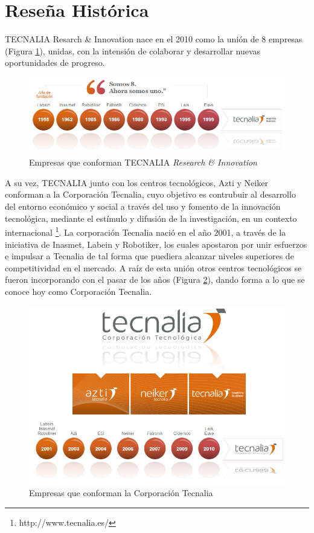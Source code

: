 \section{Reseña Histórica}
TECNALIA Resarch \& Innovation nace en el 2010 como la unión de 8 empresas (Figura \ref{fig:tecnaliah}), unidas, con la intensión de colaborar y desarrollar nuevas oportunidades de progreso.\\  
\begin{figure}[!h]
	\centering
		\includegraphics[scale=0.7]{Imagenes/tecnaliah}
		\caption[Empresas que conforman TECNALIA \textit{Research \& Innovation}, for L0F]{Empresas que conforman TECNALIA \textit{Research \& Innovation} \protect\footnotemark}
		\label{fig:tecnaliah}
	\end{figure}	  
\par A su vez, TECNALIA junto con los centros tecnológicos, Azti y Neiker conforman a la Corporación Tecnalia, cuyo objetivo es contrubuir al desarrollo del entorno económico y social a través del uso y fomento de la innovación tecnológica, mediante el estímulo y difusión de la investigación, en un contexto internacional \footnote{http://www.tecnalia.es/}. La corporación Tecnalia nació en el año 2001, a través de la iniciativa de Inasmet, Labein y Robotiker, los cuales apostaron por unir esfuerzos e impulsar a Tecnalia de tal forma que puediera alcanzar niveles superiores de competitividad en el mercado. A raíz de esta unión otros centros tecnológicos se fueron incorporando con el pasar de los años (Figura \ref{fig:ctecnalia}), dando forma a lo que se conoce hoy como Corporación Tecnalia.\\ 
\begin{figure}[!h]
	\centering
		\includegraphics[scale=0.5]{Imagenes/ctecnalia}
		\caption[Empresas que conforman la Corporación Tecnalia,for L0F]{Empresas que conforman la Corporación Tecnalia \protect\footnotemark }
		\label{fig:ctecnalia}
	\end{figure}	  
